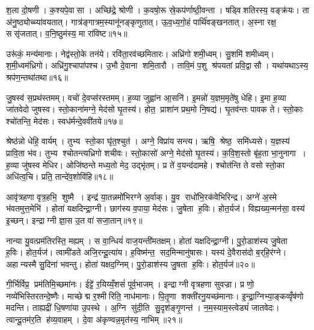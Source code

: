 श॒ला दो॒षणी। क॒श्यपे॒वासा। अच्छि॑द्रे॒ श्रोणी। क॒वषो॒रू स्रे॒कप॑र्णाष्ठी॒वन्ता। षड्विशतिरस्य॒ वङ्क्र॑यः। ता अ॑नु॒ष्ठ्योच्च्या॑वयतात्। गात्र॑ङ्गात्रम॒स्यानू॑नङ्कृणुतात्। ऊ॒व॒ध्य॒गो॒हं पार्थि॑वङ्खनतात्। अ॒स्ना रक्ष॒ ससृ॑जतात्। व॒नि॒ष्ठुम॑स्य॒ मा रा॑विष्ट॥१५॥

उरू॑कं॒ मन्य॑मानाः। नेद्व॑स्तो॒के तन॑ये। रवि॑ता॒रव॑च्छमितारः। अध्रि॑गो शमी॒ध्वम्। सु॒शमि॑ शमीध्वम्। श॒मी॒ध्वम॑ध्रिगो। अध्रि॑गु॒श्चापा॑पश्च। उ॒भौ दे॒वाना शमि॒तारौ। तावि॒मं प॒शु श्र॑पयतां प्रवि॒द्वासौ। यथा॑यथाऽस्य॒ श्रप॑ण॒न्तथा॑तथा॥१६॥\anuvakamend[ध॒त्ता॒द्बा॒हू मा रा॑विष्ट॒ तथा॑तथा]

जु॒षस्व॑ स॒प्रथ॑स्तमम्। वचो॑ दे॒वप्स॑रस्तमम्। ह॒व्या जुह्वा॑न आ॒सनि॑। इ॒मन्नो॑ य॒ज्ञम॒मृते॑षु धेहि। इ॒मा ह॒व्या जा॑तवेदो जुषस्व। स्तो॒काना॑मग्ने॒ मेद॑सो घृ॒तस्य॑। होत॒ प्राशा॑न प्रथ॒मो नि॒षद्य॑। घृ॒तव॑न्तः पावक ते। स्तो॒काः श्चो॑तन्ति॒ मेद॑सः। स्वध॑र्मन्दे॒ववी॑तये॥१७॥

श्रेष्ठ॑न्नो धेहि॒ वार्यम्। तुभ्य स्तो॒का घृ॑त॒श्चुत॑। अग्ने॒ विप्रा॑य सन्त्य। ऋषि॒ श्रेष्ठ॒ समि॑ध्यसे। य॒ज्ञस्य॑ प्रावि॒ता भ॑व। तुभ्य श्चोतन्त्यध्रिगो शचीवः। स्तो॒कासो॑ अग्ने॒ मेद॑सो घृ॒तस्य॑। क॒वि॒श॒स्तो बृ॑ह॒ता भा॒नुनागा। ह॒व्या जु॑षस्व मेधिर। ओजि॑ष्ठन्ते मध्य॒तो मेद॒ उद्भृ॑तम्। प्र ते॑ व॒यन्द॑दामहे। श्चोत॑न्ति ते वसो स्तो॒का अधि॑त्व॒चि। प्रति॒ तान्दे॑व॒शोवि॑हि॥१८॥\anuvakamend[दे॒ववी॑तय॒ उद्भृ॑त॒न्त्रीणि॑ च]

आवृ॑त्रहणा वृत्र॒हभि॒ शुष्मै। इन्द्र॑ या॒तन्नमो॑भिरग्ने अ॒र्वाक्। यु॒व राधो॑भि॒रक॑वेभिरिन्द्र। अग्ने॑ अ॒स्मे भ॑वतमुत्त॒मेभि॑। होता॑ यक्षदिन्द्रा॒ग्नी। छाग॑स्य व॒पाया॒ मेद॑सः। जु॒षेता ह॒विः। होत॒र्यज॑। विह्यख्य॒न्मन॑सा॒ वस्य॑ इ॒च्छन्। इन्द्राग्नी ज्ञा॒स उ॒त वा॑ सजा॒तान्॥१९॥

नान्या यु॒वत्प्रम॑तिरस्ति॒ मह्यम्। स वा॒न्धियं॑ वाज॒यन्ती॑मतक्षम्। होता॑ यक्षदिन्द्रा॒ग्नी। पु॒रो॒डाश॑स्य जु॒षेता ह॒विः। होत॒र्यज॑। त्वामी॑डते अजि॒रन्दू॒त्या॑य। ह॒विष्म॑न्त॒ सद॒मिन्मानु॑षासः। यस्य॑ दे॒वैरास॑दो ब॒र्‌हि॒र॑ग्ने। अहान्यस्मै सु॒दिना॑ भवन्तु। होता॑ यक्षद॒ग्निम्। पु॒रो॒डाश॑स्य जु॒षता ह॒विः। होत॒र्यज॑॥२०॥\anuvakamend[स॒जा॒तान॒ग्निन्द्वे च॑]

गी॒र्भिर्विप्र॒ प्रम॑तिमि॒च्छमा॑नः। ईट्टे॑ र॒यिय्यँ॒शसं॑ पूर्व॒भाजम्। इन्द्राग्नी वृत्रहणा सुवज्रा। प्र णो॒ नव्ये॑भिस्तिरतन्दे॒ष्णैः। माच्छेद्म र॒श्मीरिति॒ नाध॑मानाः। पि॒तृ॒णा शक्ती॑रनु॒यच्छ॑मानाः। इ॒न्द्रा॒ग्निभ्या॒ङ्कव्वृँष॑णो मदन्ति। ताह्यद्री॑ धि॒षणा॑या उ॒पस्थे। अ॒ग्नि सु॑दी॒ति सु॒दृश॑ङ्गृ॒णन्त॑। न॒म॒स्याम॒स्त्वेड्यं॑ जातवेदः। त्वान्दू॒तम॑र॒ति ह॑व्य॒वाहम्। दे॒वा अ॑कृण्वन्न॒मृत॑स्य॒ नाभिम्॥२१॥\anuvakamend[जा॒त॒वे॒दो॒ द्वे च॑]

